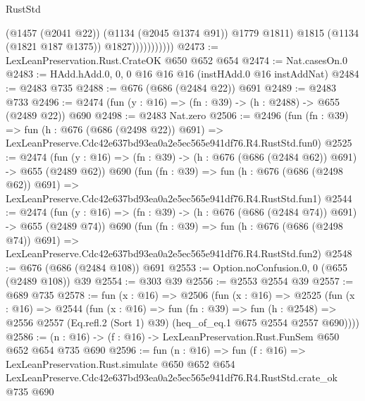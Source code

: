 \begin{lexlean}{RustStd}
\begin{coremodule}
                            (@1457 (@2041 @22))
                            (@1134 (@2045 @1374 @91))
                            @1779
                            @1811)
                          @1815
                          (@1134 (@1821 @187 @1375))
                          @1827)))))))))))
@2473 := LexLeanPreservation.Rust.CrateOK @650 @652 @654
@2474 := Nat.casesOn.{0}
@2483 := HAdd.hAdd.{0, 0, 0} @16 @16 @16 (instHAdd.{0} @16 instAddNat)
@2484 := @2483 @735
@2488 := @676 (@686 (@2484 @22)) @691
@2489 := @2483 @733
@2496 := @2474 (fun (y : @16) => (fn : @39) -> (h : @2488) -> @655 (@2489 @22)) @690
@2498 := @2483 Nat.zero
@2506 := @2496
    (fun (fn : @39) =>
    fun (h : @676 (@686 (@2498 @22)) @691) =>
    LexLeanPreserve.Cdc42e637bd93ea0a2e5ec565e941df76.R4.RustStd.fun0)
@2525 := @2474
    (fun (y : @16) => (fn : @39) -> (h : @676 (@686 (@2484 @62)) @691) -> @655 (@2489 @62))
    @690
    (fun (fn : @39) =>
    fun (h : @676 (@686 (@2498 @62)) @691) =>
    LexLeanPreserve.Cdc42e637bd93ea0a2e5ec565e941df76.R4.RustStd.fun1)
@2544 := @2474
    (fun (y : @16) => (fn : @39) -> (h : @676 (@686 (@2484 @74)) @691) -> @655 (@2489 @74))
    @690
    (fun (fn : @39) =>
    fun (h : @676 (@686 (@2498 @74)) @691) =>
    LexLeanPreserve.Cdc42e637bd93ea0a2e5ec565e941df76.R4.RustStd.fun2)
@2548 := @676 (@686 (@2484 @108)) @691
@2553 := Option.noConfusion.{0, 0} (@655 (@2489 @108)) @39
@2554 := @303 @39
@2556 := @2553 @2554 @39
@2557 := @689 @735
@2578 := fun (x : @16) =>
  @2506
    (fun (x : @16) =>
    @2525
      (fun (x : @16) =>
      @2544
        (fun (x : @16) =>
        fun (fn : @39) =>
        fun (h : @2548) =>
        @2556 @2557 (Eq.refl.{2} (Sort 1) @39) (heq_of_eq.{1} @675 @2554 @2557 @690))))
@2586 := (n : @16) -> (f : @16) -> LexLeanPreservation.Rust.FunSem @650 @652 @654 @735 @690
@2596 := fun (n : @16) =>
  fun (f : @16) =>
  LexLeanPreservation.Rust.simulate
    @650
    @652
    @654
    LexLeanPreserve.Cdc42e637bd93ea0a2e5ec565e941df76.R4.RustStd.crate_ok
    @735
    @690
\end{coremodule}
\end{lexlean}
